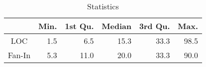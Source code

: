 \begin{table}[tb]
  \caption{Statistics }
  \label{tab:statistic}
  \centering

  \begin{tabular}{c|rrrrr}
  \hline
        & \textbf{Min.} & \textbf{1st Qu.} & \textbf{Median} & \textbf{3rd Qu.} & \textbf{Max.} \\
  \hline
   LOC  & 1.5 &   6.5 &  15.3  &   33.3 &   98.5 \\
Fan-In  & 5.3 &  11.0 &  20.0  &   33.3 &   90.0 \\
  \hline
  \end{tabular}
\end{table}






